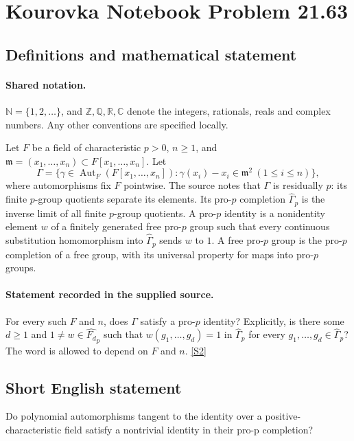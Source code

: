 \documentclass[11pt]{article}
\newcommand{\sref}[2]{\hyperlink{source:#1:#2}{[S#2]}}
\begin{document}
\section{Kourovka Notebook Problem 21.63}\label{statement}

\subsection{Definitions and mathematical statement}

\paragraph{Shared notation.}$\mathbb N=\{1,2,\ldots\}$, and $\mathbb Z,\mathbb Q,\mathbb R,\mathbb C$ denote the integers, rationals, reals and complex numbers. Any other conventions are specified locally.


Let $F$ be a field of characteristic $p>0$, $n\geq1$, and $\mathfrak m=(x_1,\ldots,x_n)\subset F[x_1,\ldots,x_n]$. Let
\[
 \Gamma=\{\gamma\in\operatorname{Aut}_F(F[x_1,\ldots,x_n]):\gamma(x_i)-x_i\in\mathfrak m^2\ (1\leq i\leq n)\},
\]
where automorphisms fix $F$ pointwise. The source notes that $\Gamma$ is residually $p$: its finite $p$-group quotients separate its elements. Its pro-$p$ completion $\widehat\Gamma_p$ is the inverse limit of all finite $p$-group quotients. A pro-$p$ identity is a nonidentity element $w$ of a finitely generated free pro-$p$ group such that every continuous substitution homomorphism into $\widehat\Gamma_p$ sends $w$ to $1$. A free pro-$p$ group is the pro-$p$ completion of a free group, with its universal property for maps into pro-$p$ groups.
\paragraph{Statement recorded in the supplied source.}
For every such $F$ and $n$, does $\Gamma$ satisfy a pro-$p$ identity? Explicitly, is there some $d\geq1$ and $1\ne w\in\widehat{F_d}_p$ such that $w(g_1,\ldots,g_d)=1$ in $\widehat\Gamma_p$ for every $g_1,\ldots,g_d\in\widehat\Gamma_p$? The word is allowed to depend on $F$ and $n$. \sref{statement}{2}
\subsection{Short English statement}
Do polynomial automorphisms tangent to the identity over a positive-characteristic field satisfy a nontrivial identity in their pro-p completion?
\end{document}
